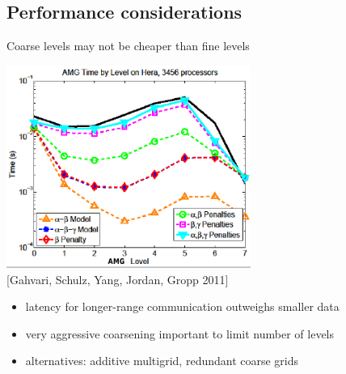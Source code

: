 \documentclass{beamer}
\begin{document}
\subsection{Performance considerations}

\begin{frame}{Coarse levels may not be cheaper than fine levels}
  \begin{center}
    \includegraphics[width=0.6\textwidth]{figures/YangAMGLevelCost} \\
    {\scriptsize [Gahvari, Schulz, Yang, Jordan, Gropp 2011]}
  \end{center}
  \begin{itemize}
  \item latency for longer-range communication outweighs smaller data
  \item very aggressive coarsening important to limit number of levels
  \item alternatives: additive multigrid, redundant coarse grids
  \end{itemize}
\end{frame}
\end{document}
